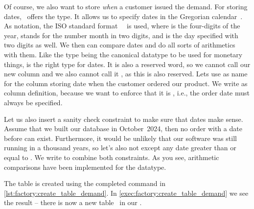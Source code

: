 Of course, we also want to store \emph{when} a customer issued the demand.
For storing dates, \sql\ offers the  type.
It allows us to specify dates in the Gregorian calendar~\cite{PGDG:PD:HU,G1582IG}.
As notation, the ISO standard format~~\cite{ISO860112019} is used, where  is the four-digits of the year,  stands for the number month in two digits, and  is the day specified with two digits as well.
We then can compare dates and do all sorts of arithmetics with them.
Like the type  being the canonical datatype to be used for monetary things,  is the right type for dates.
It is also a reserved word, so we cannot call our new column  and we also cannot call it , as this is also reserved.
Lets use  as name for the column storing date when the customer ordered our product.
We write  as column definition, because we want to enforce that it is , i.e., the order date must always be specified.%
%
\begin{sloppypar}%
Let us also insert a sanity check constraint to make sure that dates make sense.
Assume that we built our database in October~2024, then no order with a date before  can exist.
Furthermore, it would be unlikely that our software was still running in a thousand years, so let's also not except any date greater than or equal to .
We write  to combine both constraints.
As you see, arithmetic comparisons have been implemented for the  datatype.%
\end{sloppypar}%
%
The table is created using the completed command in \cref{lst:factory:create_table_demand}.
In \cref{exec:factory:create_table_demand} we see the result -- there is now a new table~ in our \db.%
%
\endhsection%
%
